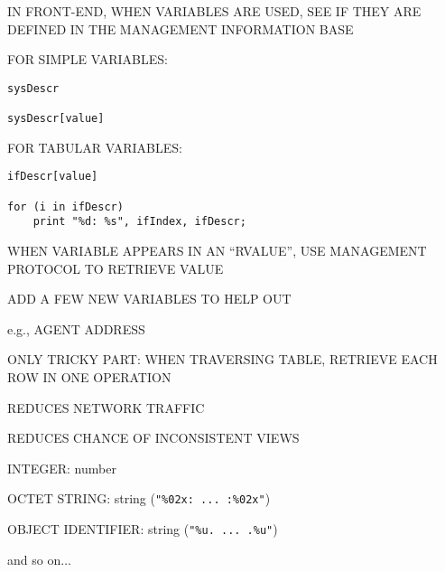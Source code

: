 \begin{bwslide}

\begin{nrtc}
\item	IN FRONT-END, WHEN VARIABLES ARE USED, SEE IF THEY ARE DEFINED
	IN THE MANAGEMENT INFORMATION BASE

\item	FOR SIMPLE VARIABLES:
\begin{verbatim}
sysDescr

sysDescr[value]
\end{verbatim}

\item	FOR TABULAR VARIABLES:
\begin{verbatim}
ifDescr[value]

for (i in ifDescr)
    print "%d: %s", ifIndex, ifDescr;
\end{verbatim}
\end{nrtc}
\end{bwslide}


\begin{bwslide}

\begin{nrtc}
\item	WHEN VARIABLE APPEARS IN AN ``RVALUE'',
	USE MANAGEMENT PROTOCOL TO RETRIEVE VALUE

\item	ADD A FEW NEW VARIABLES TO HELP OUT
    \begin{nrtc}
    \item	e.g., AGENT ADDRESS
    \end{nrtc}

\item	ONLY TRICKY PART:
	WHEN TRAVERSING TABLE, RETRIEVE EACH ROW IN ONE OPERATION
    \begin{nrtc}
    \item	REDUCES NETWORK TRAFFIC

    \item	REDUCES CHANCE OF INCONSISTENT VIEWS
    \end{nrtc}
\end{nrtc}
\end{bwslide}


\begin{bwslide}

\begin{nrtc}
\item	INTEGER: number

\item	OCTET STRING: string (\verb|"%02x: ... :%02x"|)

\item	OBJECT IDENTIFIER: string (\verb|"%u. ... .%u"|)

\item	and so on$\ldots$
\end{nrtc}
\end{bwslide}


